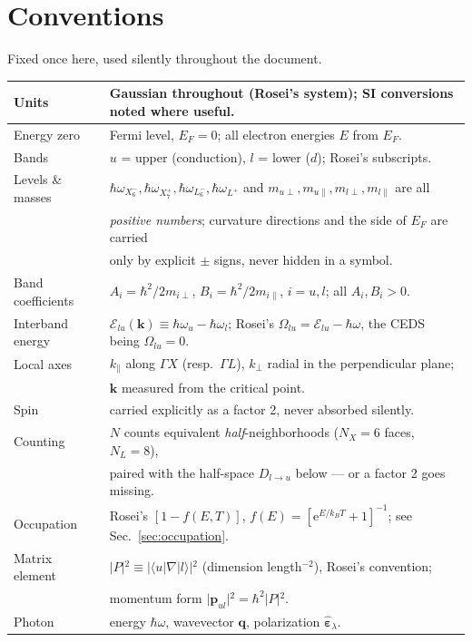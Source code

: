 \documentclass[11pt,a4paper]{article}
\numberwithin{equation}{section}
\begin{document}
\appendix
\section{Conventions}\label{sec:conv}

Fixed once here, used silently throughout the document.

\begin{center}
\begin{tabular}{ll}
\toprule
Units & Gaussian throughout (Rosei's system); SI conversions noted where useful. \\
\midrule
Energy zero & Fermi level, $E_F=0$; all electron energies $E$ from $E_F$. \\
Bands & $u$ = upper (conduction), $l$ = lower ($d$); Rosei's subscripts. \\
Levels \& masses & ${\hbar\omega_{X_6^-}},{\hbar\omega_{X_7^+}},{\hbar\omega_{L_6^-}},{\hbar\omega_{L^+}}$ and $m_{u\perp},m_{u\parallel}, m_{l\perp},m_{l\parallel}$ are all \\
 & \emph{positive numbers}; curvature directions and the side of $E_F$ are carried \\
 & only by explicit $\pm$ signs, never hidden in a symbol. \\
Band coefficients & $A_i=\hbar^2/2m_{i\perp}$, $B_i=\hbar^2/2m_{i\parallel}$, $i=u,l$; all $A_i,B_i>0$. \\
Interband energy & ${\mathcal{E}_{lu}}(\mathbf k)\equiv\hbar\omega_u-\hbar\omega_l$; Rosei's $\Omega_{lu}={\mathcal{E}_{lu}}-{\hbar\omega}$, the CEDS being $\Omega_{lu}=0$. \\
Local axes & ${k_{\parallel}}$ along $\Gamma X$ (resp.\ $\Gamma L$), ${k_{\perp}}$ radial in the perpendicular plane; \\
 & $\mathbf{k}$ measured from the critical point. \\
Spin & carried explicitly as a factor 2, never absorbed silently. \\
Counting & $N$ counts equivalent \emph{half}-neighborhoods ($N_X=6$ faces, $N_L=8$), \\
 & paired with the half-space ${D_{l\to u}}$ below --- or a factor 2 goes missing. \\
Occupation & Rosei's $[1-{f}(E,T)]$, ${f}(E)=[{\mathrm{e}}^{E/{k_B} T}+1]^{-1}$; see Sec.~\ref{sec:occupation}. \\
Matrix element & $\vert{}P\vert{}^2\equiv\vert{}\langle u\vert{}\nabla\vert{}l\rangle\vert{}^2$ (dimension length$^{-2}$), Rosei's convention; \\
 & momentum form $\vert{}{\mathbf{p}_{ul}}\vert{}^2=\hbar^2\vert{}P\vert{}^2$. \\
Photon & energy ${\hbar\omega}$, wavevector $\mathbf{q}$, polarization $\hat{\bm{{\varepsilon}}}_\lambda$. \\
\bottomrule
\end{tabular}\end{center}
\end{document}
